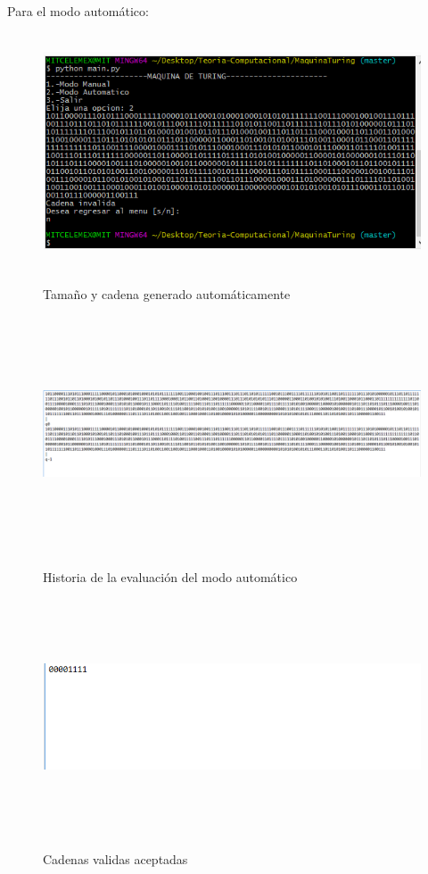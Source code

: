 Para el modo autom\'atico:\\
\begin{figure}[H]
\includegraphics[width=\textwidth, height=7cm]{ModoAutomaticoTuring.png}
\label{fig:auto_alfabeto}
\caption{Tama\~no y cadena generado autom\'aticamente}
\end{figure}

\begin{figure}[H]
\includegraphics[width=\textwidth, height=7cm]{ArchivoHistoriaTuring.png}
\label{fig:autotexto_alfabeto}
\caption{Historia de la evaluaci\'on del modo autom\'atico}
\end{figure}

\begin{figure}[H]
\includegraphics[width=\textwidth, height=7cm]{ValidasTuring.png}
\label{fig:manualtexto_alfabeto}
\caption{Cadenas validas aceptadas}
\end{figure}

\newpage